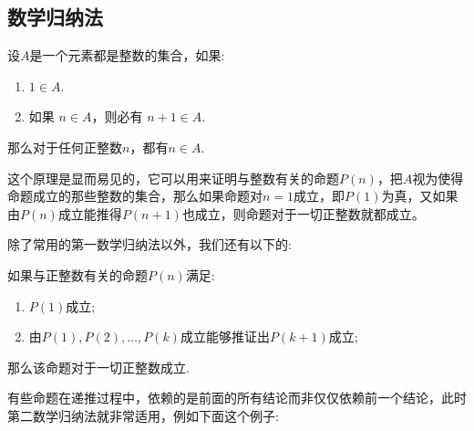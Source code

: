 \subsection{数学归纳法}
\label{subsec:mathematical-induction}

\begin{principle}[第一数学归纳法]
  设$A$是一个元素都是整数的集合，如果:
  \begin{enumerate}
  \item $1 \in A$.
  \item 如果 $n \in A$，则必有 $ n+1 \in A$.
  \end{enumerate}
  那么对于任何正整数$n$，都有$n \in A$.
\end{principle}

这个原理是显而易见的，它可以用来证明与整数有关的命题$P(n)$，把$A$视为使得命题成立的那些整数的集合，那么如果命题对$n=1$成立，即$P(1)$为真，又如果由$P(n)$成立能推得$P(n+1)$也成立，则命题对于一切正整数就都成立。

除了常用的第一数学归纳法以外，我们还有以下的:
\begin{principle}[第二数学归纳法]
如果与正整数有关的命题$P(n)$满足:
  \begin{enumerate}
  \item $P(1)$成立;
  \item 由$P(1),P(2),\dots,P(k)$成立能够推证出$P(k+1)$成立;
  \end{enumerate}
那么该命题对于一切正整数成立.
\end{principle}
有些命题在递推过程中，依赖的是前面的所有结论而非仅仅依赖前一个结论，此时第二数学归纳法就非常适用，例如下面这个例子:

